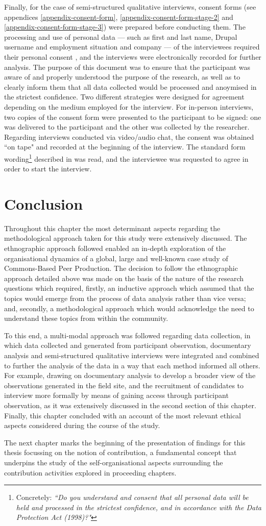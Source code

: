 Finally, for the case of semi-structured qualitative interviews, consent forms (see appendices \ref{appendix-consent-form}, \ref{appendix-consent-form-stage-2} and \ref{appendix-consent-form-stage-3}) were prepared before conducting them. The processing and use of personal data --- such as first and last name, Drupal username and employment situation and company --- of the interviewees required their personal consent \parencite{UEC2013}, and the interviews were electronically recorded for further analysis. The purpose of this document was to ensure that the participant was aware of and properly understood the purpose of the research, as well as to clearly inform them that all data collected would be processed and anoymised in the strictest confidence. Two different strategies were designed for agreement depending on the medium employed for the interview. For in-person interviews, two copies of the consent form were presented to the participant to be signed: one was delivered to the participant and the other was collected by the researcher. Regarding interviews conducted via video/audio chat, the consent was obtained ``on tape" and recorded at the beginning of the interview. The standard form wording\footnote{Concretely: \emph{``Do you understand and consent that all personal data will be held and processed in the strictest confidence, and in accordance with the Data Protection Act (1998)?"}} described in \textcite{UEC2013} was read, and the interviewee was requested to agree in order to start the interview. 

\section{Conclusion}

Throughout this chapter the most determinant aspects regarding the methodological approach taken for this study were extensively discussed. The ethnographic approach followed enabled an in-depth exploration of the organisational dynamics of a global, large and well-known case study of Commons-Based Peer Production. The decision to follow the ethnographic approach detailed above was made on the basis of the nature of the research questions which required, firstly, an inductive approach which assumed that the topics would emerge from the process of data analysis rather than vice versa; and, secondly, a methodological approach which would acknowledge the need to understand these topics from within the community.

To this end, a multi-modal approach was followed regarding data collection, in which data collected and generated from participant observation, documentary analysis and semi-structured qualitative interviews were integrated and combined to further the analysis of the data in a way that each method informed all others. For example, drawing on documentary analysis to develop a broader view of the observations generated in the field site, and the recruitment of candidates to interview more formally by means of gaining access through participant observation, as it was extensively discussed in the second section of this chapter. Finally, this chapter concluded with an account of the most relevant ethical aspects considered during the course of the study.

The next chapter marks the beginning of the presentation of findings for this thesis focussing on the notion of contribution, a fundamental concept that underpins the study of the self-organisational aspects surrounding the contribution activities explored in proceeding chapters.